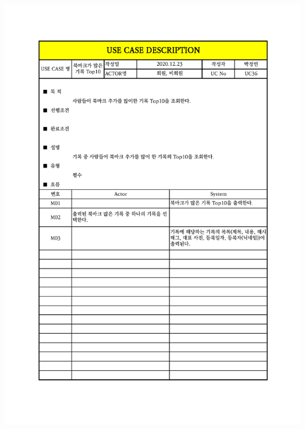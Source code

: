 {{{{{{{{{{{{{{{{{{{{{{{{{{{{{{{{{{{{{{\includegraphics[width=1.1\textwidth]{./Figure/Design/Display/usecase/036.pdf} \\
}}}}}}}}}}}}}}}}}}}}}}}}}}}}}}}}}}}}}}
